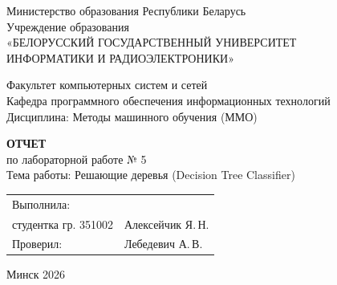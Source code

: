\documentclass[14pt,a4paper]{extarticle}
\begin{document}
\begin{titlepage}
    \begin{center}
        Министерство образования Республики Беларусь\\[0.15cm]
        Учреждение образования\\[0.15cm]
        «БЕЛОРУССКИЙ ГОСУДАРСТВЕННЫЙ УНИВЕРСИТЕТ\\
        ИНФОРМАТИКИ И РАДИОЭЛЕКТРОНИКИ»
    \end{center}
    
    \vspace{0.4cm}
    
    \begin{flushleft}
        Факультет компьютерных систем и сетей\\[0.1cm]
        Кафедра программного обеспечения информационных технологий\\[0.1cm]
        Дисциплина: Методы машинного обучения (ММО)
    \end{flushleft}
    
    \vspace{2.2cm}
    
    \begin{center}
        \large\textbf{ОТЧЕТ}\\[0.2cm]
        \normalsize
        {по лабораторной работе № 5}\\[0.3cm]
        Тема работы: Решающие деревья (Decision Tree Classifier)
    \end{center}
    
    \vspace{2.5cm}
    
    \noindent
    \begin{tabular}{@{}p{}@{}p{}@{}}
        Выполнила: & \\
        студентка гр. 351002 & Алексейчик Я.\,Н. \\[0.5cm]
        Проверил: & Лебедевич А.\,В.
    \end{tabular}
    
    \vfill
    
    \begin{center}
        Минск 2026
    \end{center}
\end{titlepage}
\end{document}
